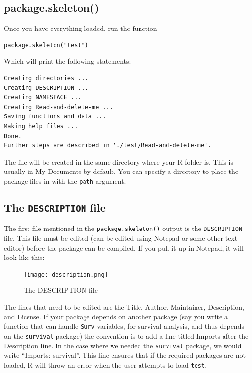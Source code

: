 \documentclass{article}
\begin{document}
\subsection{package.skeleton()}
Once you have everything loaded, run the function
\begin{verbatim}
package.skeleton("test")
\end{verbatim}
Which will print the following statements:
\begin{verbatim}
Creating directories ...
Creating DESCRIPTION ...
Creating NAMESPACE ...
Creating Read-and-delete-me ...
Saving functions and data ...
Making help files ...
Done.
Further steps are described in './test/Read-and-delete-me'.
\end{verbatim}
The file will be created in the same directory where your R folder is. This is usually in My Documents by default. You can specify a directory to place the package files in with the \texttt{path} argument. 

\subsection{The \texttt{DESCRIPTION} file}
The first file mentioned in the \texttt{package.skeleton()} output is the \texttt{DESCRIPTION} file. This file must be edited (can be edited using Notepad or some other text editor) before the package can be compiled. If you pull it up in Notepad, it will look like this:
\begin{figure}[h]
\caption{The DESCRIPTION file}
\texttt{[image: description.png]}
\end{figure}
The lines that need to be edited are the Title, Author, Maintainer, Description, and License. If your package depends on another package (say you write a function that can handle \texttt{Surv} variables, for survival analysis, and thus depends on the \texttt{survival} package) the convention is to add a line titled Imports after the Description line. In the case where we needed the \texttt{survival} package, we would write ``Imports: survival''. This line ensures that if the required packages are not loaded, R will throw an error when the user attempts to load \texttt{test}.
\clearpage
\end{document}
